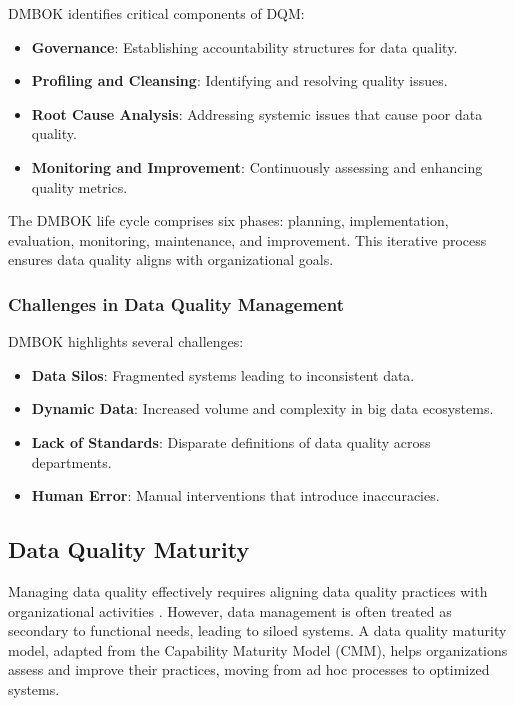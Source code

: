 \documentclass[conference]{IEEEtran}
\begin{document}
DMBOK identifies critical components of DQM:
\begin{itemize}
    \item \textbf{Governance}: Establishing accountability structures for data quality.
    \item \textbf{Profiling and Cleansing}: Identifying and resolving quality issues.
    \item \textbf{Root Cause Analysis}: Addressing systemic issues that cause poor data quality.
    \item \textbf{Monitoring and Improvement}: Continuously assessing and enhancing quality metrics.
\end{itemize}

The DMBOK life cycle comprises six phases: planning, implementation, evaluation, monitoring, maintenance, and improvement. This iterative process ensures data quality aligns with organizational goals.

\subsubsection{Challenges in Data Quality Management}
DMBOK highlights several challenges:
\begin{itemize}
    \item \textbf{Data Silos}: Fragmented systems leading to inconsistent data.
    \item \textbf{Dynamic Data}: Increased volume and complexity in big data ecosystems.
    \item \textbf{Lack of Standards}: Disparate definitions of data quality across departments.
    \item \textbf{Human Error}: Manual interventions that introduce inaccuracies.
\end{itemize}


\subsection{Data Quality Maturity}

Managing data quality effectively requires aligning data quality practices with organizational activities \cite{loshin_dqi}. However, data management is often treated as secondary to functional needs, leading to siloed systems. A data quality maturity model, adapted from the Capability Maturity Model (CMM), helps organizations assess and improve their practices, moving from ad hoc processes to optimized systems.
\end{document}
